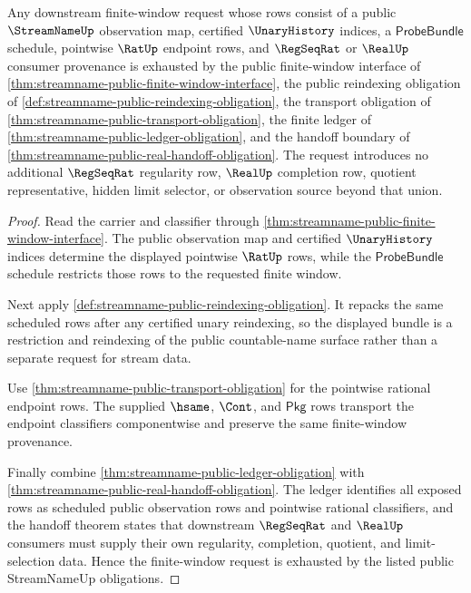 \begin{theorem}
\label{thm:streamname-finite-window-schedule-exhaustion}
Any downstream finite-window request whose rows consist of a public
$\StreamNameUp$ observation map, certified $\UnaryHistory$ indices, a
$\mathsf{ProbeBundle}$ schedule, pointwise $\RatUp$ endpoint rows, and
$\RegSeqRat$ or $\RealUp$ consumer provenance is exhausted by the public
finite-window interface of
\autoref{thm:streamname-public-finite-window-interface}, the public reindexing
obligation of \autoref{def:streamname-public-reindexing-obligation}, the
transport obligation of \autoref{thm:streamname-public-transport-obligation},
the finite ledger of \autoref{thm:streamname-public-ledger-obligation}, and the
handoff boundary of \autoref{thm:streamname-public-real-handoff-obligation}.
The request introduces no additional $\RegSeqRat$ regularity row, $\RealUp$
completion row, quotient representative, hidden limit selector, or observation
source beyond that union.
\end{theorem}
\begin{proof}
Read the carrier and classifier through
\autoref{thm:streamname-public-finite-window-interface}. The public observation
map and certified $\UnaryHistory$ indices determine the displayed pointwise
$\RatUp$ rows, while the $\mathsf{ProbeBundle}$ schedule restricts those rows
to the requested finite window.

Next apply \autoref{def:streamname-public-reindexing-obligation}. It repacks
the same scheduled rows after any certified unary reindexing, so the displayed
bundle is a restriction and reindexing of the public countable-name surface
rather than a separate request for stream data.

Use \autoref{thm:streamname-public-transport-obligation} for the pointwise
rational endpoint rows. The supplied $\hsame$, $\Cont$, and $\mathsf{Pkg}$ rows
transport the endpoint classifiers componentwise and preserve the same
finite-window provenance.

Finally combine \autoref{thm:streamname-public-ledger-obligation} with
\autoref{thm:streamname-public-real-handoff-obligation}. The ledger identifies
all exposed rows as scheduled public observation rows and pointwise rational
classifiers, and the handoff theorem states that downstream $\RegSeqRat$ and
$\RealUp$ consumers must supply their own regularity, completion, quotient, and
limit-selection data. Hence the finite-window request is exhausted by the
listed public StreamNameUp obligations.
\end{proof}

